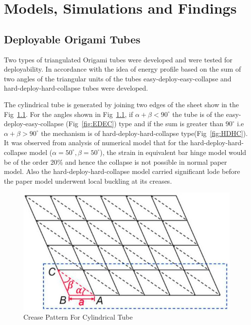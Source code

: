\chapter{Models, Simulations and Findings}


\section{Deployable Origami Tubes}
Two types of triangulated Origami tubes were developed and were tested for deployability. In accordance with the idea of energy profile based on the sum of two angles of the triangular units of the tubes easy-deploy-easy-collapse and hard-deploy-hard-collapse tubes were developed\cite{Zha}. 

The cylindrical tube is generated by joining two edges of the sheet show in the Fig~\ref{fig:AlphaBeta}. For the angles shown in Fig~\ref{fig:AlphaBeta}, if $\alpha + \beta < 90^{\circ}$ the tube is of the easy-deploy-easy-collapse (Fig~\ref{fig:EDEC}) type and if the sum is greater than $90^{\circ}$ i.e $\alpha + \beta > 90^{\circ}$ the mechanism is of hard-deploy-hard-collapse type(Fig~\ref{fig:HDHC}). It was observed from analysis of numerical model that for the hard-deploy-hard-collapse model ($\alpha = 50^{\circ}, \beta = 50^{\circ}$), the strain in equivalent bar hinge model would be of the order 20\% and hence the collapse is not possible in normal paper model. Also the hard-deploy-hard-collapse model carried significant lode before the paper model underwent local buckling at its creases.
\begin{figure}[htbp]
\centering
\includegraphics[width=0.6\linewidth]{introduction/fig/AlphaBeta.jpg}
\caption{Crease Pattern For Cylindrical Tube}
\label{fig:AlphaBeta}
\end{figure}

